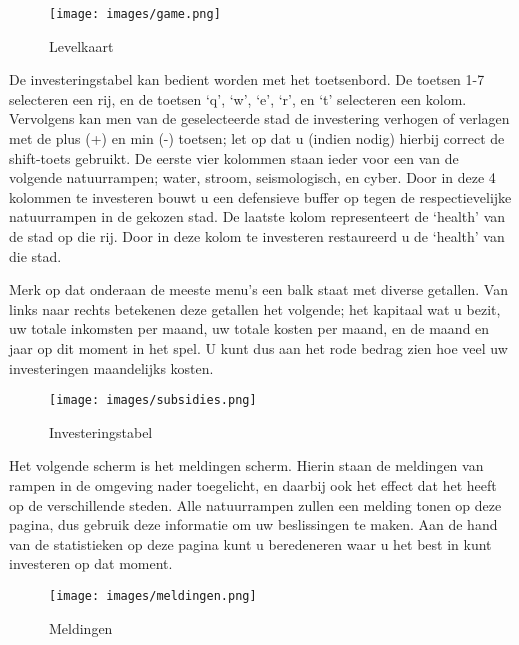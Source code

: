 \documentclass{article}
\begin{document}

\begin{figure}[H]
\centering
\texttt{[image: images/game.png]}
\label{fig:map}
\caption{Levelkaart}
\end{figure}

De investeringstabel kan bedient worden met het toetsenbord. De toetsen 1-7 selecteren een rij, en de toetsen `q', `w', `e', `r', en `t' selecteren een kolom. Vervolgens kan men van de geselecteerde stad de investering verhogen of verlagen met de plus (+) en min (-) toetsen; let op dat u (indien nodig) hierbij correct de shift-toets gebruikt. De eerste vier kolommen staan ieder voor een van de volgende natuurrampen; water, stroom, seismologisch, en cyber. Door in deze 4 kolommen te investeren bouwt u een defensieve buffer op tegen de respectievelijke natuurrampen in de gekozen stad. De laatste kolom representeert de `health' van de stad op die rij. Door in deze kolom te investeren restaureerd u de `health' van die stad.

Merk op dat onderaan de meeste menu's een balk staat met diverse getallen. Van links naar rechts betekenen deze getallen het volgende; het kapitaal wat u bezit, uw totale inkomsten per maand, uw totale kosten per maand, en de maand en jaar op dit moment in het spel. U kunt dus aan het rode bedrag zien hoe veel uw investeringen maandelijks kosten.

\begin{figure}[H]
\centering
\texttt{[image: images/subsidies.png]}
\label{fig:start}
\caption{Investeringstabel}
\end{figure}

Het volgende scherm is het meldingen scherm. Hierin staan de meldingen van rampen in de omgeving nader toegelicht, en daarbij ook het effect dat het heeft op de verschillende steden. Alle natuurrampen zullen een melding tonen op deze pagina, dus gebruik deze informatie om uw beslissingen te maken. Aan de hand van de statistieken op deze pagina kunt u beredeneren waar u het best in kunt investeren op dat moment.

\begin{figure}[H]
\centering
\texttt{[image: images/meldingen.png]}
\label{fig:map}
\caption{Meldingen}
\end{figure}
\end{document}
